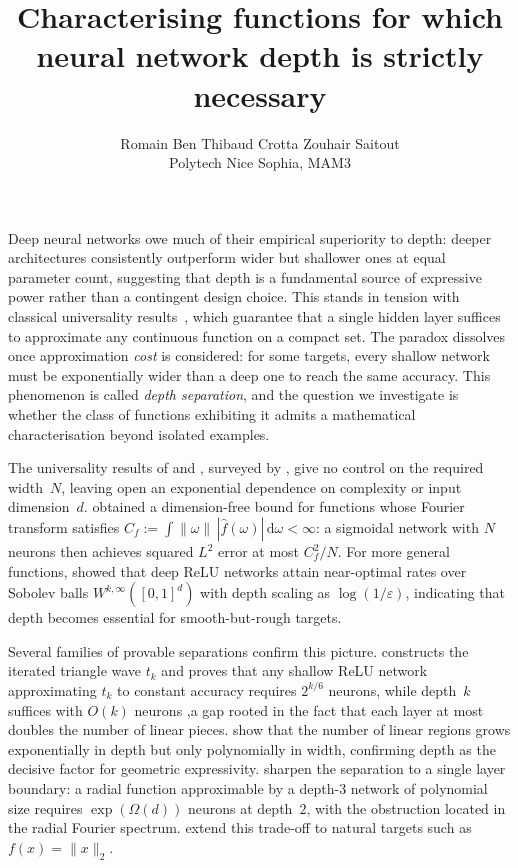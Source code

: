 \documentclass[10pt]{article}
\title{\vspace{-1.5em}\textbf{Characterising functions for which neural network depth is
strictly necessary}\vspace{-0.5em}}
\author{Romain Ben \quad Thibaud Crotta \quad Zouhair Saitout \\[2pt]
\small Polytech Nice Sophia, MAM3}
\date{}
\begin{document}
\maketitle

Deep neural networks owe much of their empirical superiority to depth: deeper architectures
consistently outperform wider but shallower ones at equal parameter count, suggesting that depth
is a fundamental source of expressive power rather than a contingent design choice. This stands
in tension with classical universality results~\citep{cybenko89,hornik91}, which guarantee that
a single hidden layer suffices to approximate any continuous function on a compact set. The
paradox dissolves once approximation \emph{cost} is considered: for some targets, every shallow
network must be exponentially wider than a deep one to reach the same accuracy. This phenomenon
is called \emph{depth separation}, and the question we investigate is whether the class of
functions exhibiting it admits a mathematical characterisation beyond isolated examples.

The universality results of \citet{cybenko89} and \citet{hornik91}, surveyed by
\citet{pinkus99}, give no control on the required width~$N$, leaving open an exponential
dependence on complexity or input dimension~$d$. \citet{barron93} obtained a dimension-free
bound for functions whose Fourier transform satisfies $C_f := \int\|\omega\|\,|\hat
f(\omega)|\,\mathrm{d}\omega < \infty$: a sigmoidal network with $N$ neurons then achieves
squared $L^2$ error at most $C_f^2/N$. For more general functions, \citet{yarotsky17} showed
that deep ReLU networks attain near-optimal rates over Sobolev balls $W^{k,\infty}([0,1]^d)$
with depth scaling as $\log(1/\varepsilon)$, indicating that depth becomes essential for
smooth-but-rough targets.

Several families of provable separations confirm this picture. \citet{telgarsky16} constructs
the iterated triangle wave $t_k$ and proves that any shallow ReLU network approximating $t_k$
to constant accuracy requires $2^{k/6}$ neurons, while depth~$k$ suffices with $O(k)$ neurons
,a gap rooted in the fact that each layer at most doubles the number of linear pieces.
\citet{montufar14} show that the number of linear regions grows exponentially in depth but only
polynomially in width, confirming depth as the decisive factor for geometric expressivity.
\citet{eldan16} sharpen the separation to a single layer boundary: a radial function
approximable by a depth-$3$ network of polynomial size requires $\exp(\Omega(d))$ neurons at
depth~$2$, with the obstruction located in the radial Fourier spectrum. \citet{safran17} extend
this trade-off to natural targets such as $f(x)=\|x\|_2$.
\end{document}
